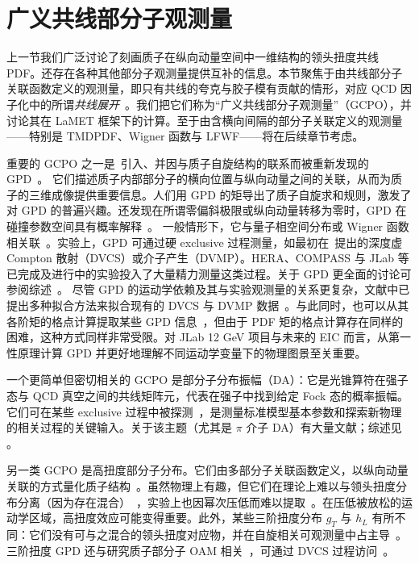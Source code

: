 \section{广义共线部分子观测量}
\label{sec:gpo}
上一节我们广泛讨论了刻画质子在纵向动量空间中一维结构的领头扭度共线 PDF。还存在各种其他部分子观测量提供互补的信息。本节聚焦于由共线部分子关联函数定义的观测量，即只有共线的夸克与胶子模有贡献的情形，对应 QCD 因子化中的所谓{\it 共线展开}~\cite{Sterman:1994ce,Collins:2011zzd}。我们把它们称为``广义共线部分子观测量''（GCPO），并讨论其在 LaMET 框架下的计算。至于由含横向间隔的部分子关联定义的观测量——特别是 TMDPDF、Wigner 函数与 LFWF——将在后续章节考虑。

重要的 GCPO 之一是~\cite{Mueller:1998fv}引入、并因与质子自旋结构的联系而被重新发现的 GPD~\cite{Ji:1996ek}。
%
它们描述质子内部部分子的横向位置与纵向动量之间的关联，从而为质子的三维成像提供重要信息。人们用 GPD 的矩导出了质子自旋求和规则，激发了对 GPD 的普遍兴趣。还发现在所谓零偏斜极限或纵向动量转移为零时，GPD 在碰撞参数空间具有概率解释~\cite{Burkardt:2000za}。
%
一般情形下，它与量子相空间分布或 Wigner 函数相关联~\cite{Ji:2003ak,Belitsky:2003nz}。实验上，GPD 可通过硬 exclusive 过程测量，如最初在~\cite{Ji:1996ek,Ji:1996nm}提出的深度虚 Compton 散射（DVCS）或介子产生（DVMP）。HERA、COMPASS 与 JLab 等已完成及进行中的实验投入了大量精力测量这类过程。关于 GPD 更全面的讨论可参阅综述~\cite{Ji:1998pc,Ji:2004gf,Diehl:2003ny,Belitsky:2005qn}。
%
尽管 GPD 的运动学依赖及其与实验观测量的关系更复杂，文献中已提出多种拟合方法来拟合现有的 DVCS 与 DVMP 数据~\cite{Kumericki:2016ehc,Favart:2015umi}。与此同时，也可以从其各阶矩的格点计算提取某些 GPD 信息~\cite{Hagler:2007xi,Gockeler:2003jfa,Alexandrou:2019ali}，但由于 PDF 矩的格点计算存在同样的困难，这种方式同样非常受限。对 JLab 12 GeV 项目与未来的 EIC 而言，从第一性原理计算 GPD 并更好地理解不同运动学变量下的物理图景至关重要。


一个更简单但密切相关的 GCPO 是部分子分布振幅（DA）：它是光锥算符在强子态与 QCD 真空之间的共线矩阵元，代表在强子中找到给定 Fock 态的概率振幅。它们可在某些 exclusive 过程中被探测~\cite{Brodsky:2002st}，是测量标准模型基本参数和探索新物理的相关过程的关键输入。关于该主题（尤其是 $\pi$ 介子 DA）有大量文献；综述见 \cite{Brodsky:1989pv,Grozin:2005iz,Braun:2006hn}。

另一类 GCPO 是高扭度部分子分布。它们由多部分子关联函数定义，以纵向动量关联的方式量化质子结构~\cite{Jaffe:1982pm,Ellis:1982cd,Jaffe:1991ra}。虽然物理上有趣，但它们在理论上难以与领头扭度分布分离（因为存在混合）~\cite{Mueller:1984vh,Ji:1994md}，实验上也因幂次压低而难以提取~\cite{Ji:1993ey}。在压低被放松的运动学区域，高扭度效应可能变得重要。此外，某些三阶扭度分布 $g_T$ 与 $h_L$ 有所不同：它们没有可与之混合的领头扭度对应物，并在自旋相关可观测量中占主导~\cite{Jaffe:1991ra}。三阶扭度 GPD 还与研究质子部分子 OAM 相关~\cite{Hatta:2012cs,Ji:2012ba,Courtoy:2013oaa}，可通过 DVCS 过程访问~\cite{Penttinen:2000dg,Kiptily:2002nx}。


